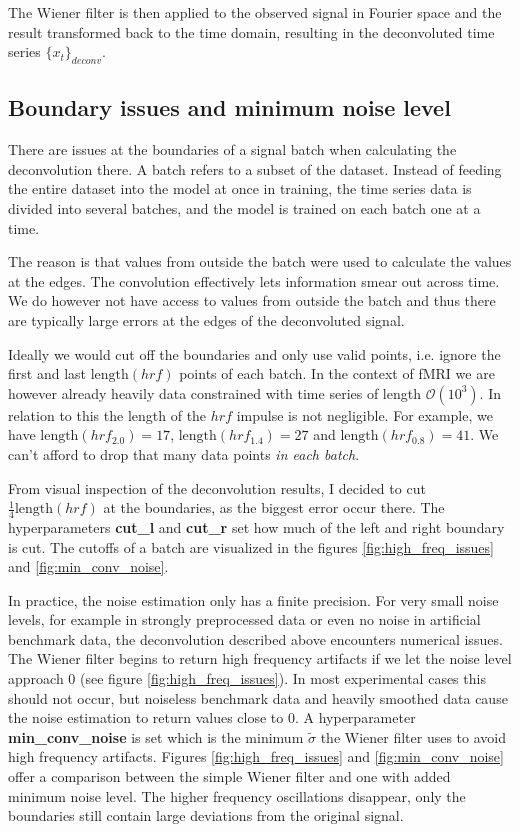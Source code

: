 The Wiener filter is then applied to the observed signal in Fourier space and the result transformed back to the time domain, resulting in the deconvoluted 
time series $\{x_t\}_{deconv}$.

\subsection{Boundary issues and minimum noise level}

There are issues at the boundaries of a signal batch when calculating the deconvolution there. A batch refers to a subset of the dataset. 
Instead of feeding the entire dataset into the model at once in training, the time series data is divided into several batches, 
and the model is trained on each batch one at a time.

The reason is that values from outside the batch were used to calculate 
the values at the edges. The convolution effectively lets information smear out across time. We do however not have access to values from outside the batch and thus
there are typically large errors at the edges of the deconvoluted signal.

Ideally we would cut off the boundaries and only use valid points, i.e. ignore the first and last $\text{length}(hrf)$ points of each batch. In the context of fMRI we are 
however already heavily data constrained with time series of length $\mathcal{O}(10^3)$. In relation to this the length of the $hrf$ impulse is not negligible. For 
example, we have $\text{length}(hrf_{2.0}) = 17$, $\text{length}(hrf_{1.4}) = 27$ and $\text{length}(hrf_{0.8}) = 41$. We can't afford to drop that many data points 
\textit{in each batch}. 

From visual inspection of the deconvolution results, I decided to cut $\frac{1}{4} \text{length}(hrf)$ at the boundaries, as the 
biggest error occur there. The hyperparameters \textbf{cut\_l} and \textbf{cut\_r} set how much of the left and right boundary is cut. The cutoffs of a batch 
are visualized in the figures \ref{fig:high_freq_issues} and \ref{fig:min_conv_noise}.  

In practice, the noise estimation only has a finite precision. For very small noise levels, for example in strongly preprocessed data or even no noise in artificial 
benchmark data, the deconvolution described above encounters numerical issues. The Wiener filter begins to return high frequency artifacts if we let the noise level 
approach $0$ (see figure \ref{fig:high_freq_issues}).  In most experimental cases this should not occur, but noiseless benchmark data and heavily smoothed data 
cause the noise estimation to return values close to $0$.
A hyperparameter \textbf{min\_conv\_noise} is set which is the minimum $\tilde{\sigma}$ the Wiener filter uses to avoid high frequency artifacts. Figures 
\ref{fig:high_freq_issues} and \ref{fig:min_conv_noise} offer a comparison between the simple Wiener filter and one with added minimum noise level. The 
higher frequency oscillations disappear, only the boundaries still contain large deviations from the original signal.

